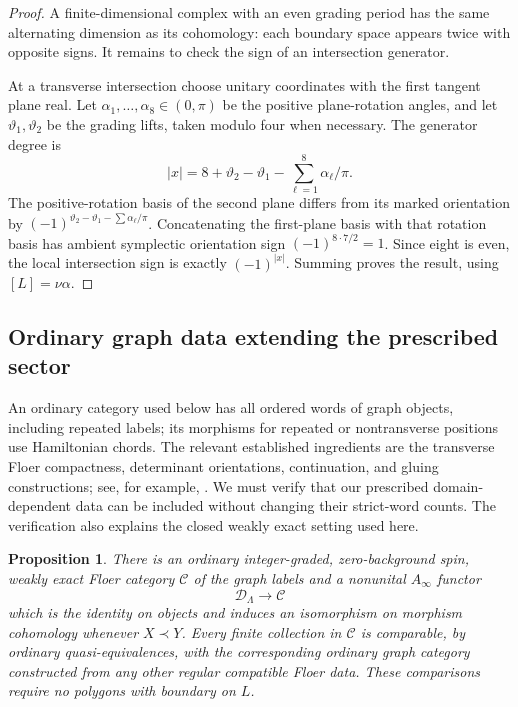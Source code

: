 \documentclass[11pt]{article}
\newtheorem{proposition}[theorem]{Proposition}
\theoremstyle{definition}
\theoremstyle{remark}
\numberwithin{equation}{section}
\begin{document}
\begin{proof}
A finite-dimensional complex with an even grading period has the same
alternating dimension as its cohomology: each boundary space appears
twice with opposite signs.  It remains to check the sign of an
intersection generator.

At a transverse intersection choose unitary coordinates with the first
tangent plane real.  Let \(\alpha_1,\ldots,\alpha_8\in(0,\pi)\) be the
positive plane-rotation angles, and let \(\vartheta_1,\vartheta_2\) be
the grading lifts, taken modulo four when necessary.  The generator
degree is
\begin{equation}\label{cat:cap-degree}
 |x|=8+\vartheta_2-\vartheta_1
                  -\sum_{\ell=1}^8\alpha_\ell/\pi.
\end{equation}
The positive-rotation basis of the second plane differs from its marked
orientation by
\((-1)^{\vartheta_2-\vartheta_1-\sum\alpha_\ell/\pi}\).
Concatenating the first-plane basis with that rotation basis has ambient
symplectic orientation sign \((-1)^{8\cdot7/2}=1\).  Since eight is even,
the local intersection sign is exactly \((-1)^{|x|}\).
Summing proves the result, using \([L]=\nu\alpha\).
\end{proof}

\subsection{Ordinary graph data extending the prescribed sector}

An ordinary category used below has all ordered words of graph objects,
including repeated labels; its morphisms for repeated or nontransverse
positions use Hamiltonian chords.  The relevant established ingredients
are the transverse Floer compactness, determinant orientations,
continuation, and gluing constructions; see, for example,
\cite{seidel}.  We must verify that our prescribed domain-dependent
data can be included without changing their strict-word counts.
The verification also explains the closed weakly exact setting used
here.

\begin{proposition}\label{cat:ordinary-comparison}
There is an ordinary integer-graded, zero-background spin, weakly exact
Floer category \(\mathcal C\) of the graph labels and a nonunital
\(A_\infty\) functor
\[
 \mathcal D_\Lambda\longrightarrow\mathcal C
\]
which is the identity on objects and induces an isomorphism on morphism
cohomology whenever \(X\prec Y\).
Every finite collection in \(\mathcal C\) is comparable, by ordinary
quasi-equivalences, with the corresponding ordinary graph category
constructed from any other regular compatible Floer data.
These comparisons require no polygons with boundary on \(L\).
\end{proposition}
\end{document}
